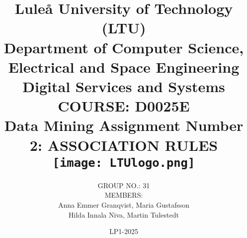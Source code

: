 \title{
    {\large Luleå University of Technology (LTU)}\\
    {\large Department of Computer Science, Electrical and Space Engineering}\\
    {\large Digital Services and Systems}\\
    {\large COURSE: D0025E}\\
    {Data Mining Assignment Number 2: ASSOCIATION RULES}\\
    {\centering\texttt{[image: LTUlogo.png]}}\\
}

\author{
    \vspace{0.3cm}
    GROUP NO.: 31\\
    \vspace{0.3cm}
    MEMBERS:\\
    Anna Emmer Granqvist,
    Maria Gustafsson\\
    Hilda Innala Niva,
    Martin Tulestedt \\
}

\vspace{0.5cm}
\date{LP1-2025}

\maketitle
\thispagestyle{empty}
\addtocounter{page}{-1}